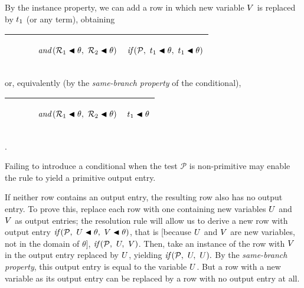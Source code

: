 \documentclass[runningheads]{llncs}
\DeclareMathOperator{\uand}{\emph{and}\,}
\begin{document}
\noindent By the instance property, we can add a row in which new variable $V$ is replaced by ${t}_{1}$ (or any term), obtaining


 \begin{center}
\begin{tabular} {T}
\hline
    $\qquad$ & \begin{center}$\uand(\expsub{\mathcal{R}}{1} \apply \theta, \ \expsub{\mathcal{R}}{2} \apply \theta)$ \end{center} & \begin{center} $\emph{if}\,( {\mathcal{P}},\allowbreak \ {{t}_{1} \blacktriangleleft \theta},\allowbreak \ {{t}_{1} \blacktriangleleft \theta})$\end{center} \\
  \hline
\end{tabular}
\end{center}




\noindent or, equivalently (by the \emph{same-branch property} of the conditional), 
   \begin{center}
\begin{tabular} {T}
\hline
    $\qquad$ & \begin{center}$\uand(\expsub{\mathcal{R}}{1} \apply \theta, \ \expsub{\mathcal{R}}{2} \apply \theta) $ \end{center} & \begin{center}${t}_{1}\blacktriangleleft \theta$\end{center} \\
  \hline
\end{tabular}.
\end{center}

\noindent Failing to introduce a conditional when the test $\mathcal{P}$ is non-primitive may enable the rule to yield a primitive output entry.

If neither row contains an output entry, the resulting row also has no output entry. To  prove this, replace each row with one containing new variables $U$ and $V$ as output entries; the resolution rule will allow us to derive a new row with output entry $\emph{if}\,( {\mathcal{P}},\allowbreak \ {U \blacktriangleleft \theta},\allowbreak \ {V \blacktriangleleft \theta})$, that is [because $U$ and $V$ are new variables, not in the domain of $\theta$], $\emph{if}\,( {\mathcal{P}},\allowbreak \ {U },\allowbreak \ {V})$. Then, take an instance of the row with $V$ in the output entry replaced by $U$, yielding  $\emph{if}\,( {\mathcal{P}},\allowbreak \ {U },\allowbreak \ {U}).$ By the \emph{same-branch property}, this output entry is equal to the variable $U$. But a row with a new variable as its output entry can be replaced by a row with no output entry at all.
\end{document}
